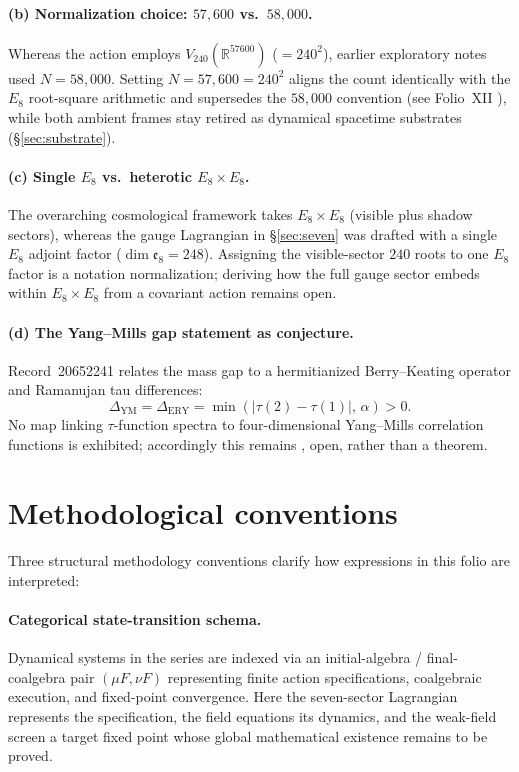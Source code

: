 \documentclass{alienfolio}
\begin{document}
\paragraph{(b) Normalization choice: $57{,}600$ vs.\ $58{,}000$.}
Whereas the action employs $V_{240}(\mathbb{R}^{57600})$ ($=240^2$),
earlier exploratory notes used $N = 58{,}000$. Setting $N = 57{,}600 =
240^2$ aligns the count identically with the $E_8$ root-square
arithmetic and supersedes the $58{,}000$ convention (see Folio~XII
\cite{folio-xii}), while both ambient frames stay retired as dynamical
spacetime substrates (\S\ref{sec:substrate}).

\paragraph{(c) Single $E_8$ vs.\ heterotic $E_8 \times E_8$.}
The overarching cosmological framework takes $E_8 \times E_8$ (visible
plus shadow sectors), whereas the gauge Lagrangian in \S\ref{sec:seven}
was drafted with a single $E_8$ adjoint factor ($\dim\mathfrak{e}_8 =
248$). Assigning the visible-sector $240$ roots to one $E_8$ factor is a
notation normalization; deriving how the full gauge sector embeds within
$E_8 \times E_8$ from a covariant action remains open.

\paragraph{(d) The Yang--Mills gap statement as conjecture.}
Record~20652241 \cite{rec20652241} relates the mass gap to a
hermitianized Berry--Keating operator and Ramanujan tau differences:
\begin{equation}
\Delta_{\mathrm{YM}} = \Delta_{\mathrm{ERY}}
= \min(|\tau(2)-\tau(1)|,\,\alpha) > 0 .
\end{equation}
No map linking $\tau$-function spectra to four-dimensional Yang--Mills
correlation functions is exhibited; accordingly this remains
, open, rather than a theorem.

\section{Methodological conventions}
\label{sec:method}

Three structural methodology conventions clarify how expressions in this
folio are interpreted:

\paragraph{Categorical state-transition schema.}
Dynamical systems in the series are indexed via an initial-algebra /
final-coalgebra pair $(\mu F, \nu F)$ representing finite action
specifications, coalgebraic execution, and fixed-point convergence. Here
the seven-sector Lagrangian represents the specification, the field
equations its dynamics, and the weak-field screen a target fixed point
whose global mathematical existence remains to be proved.
\end{document}
